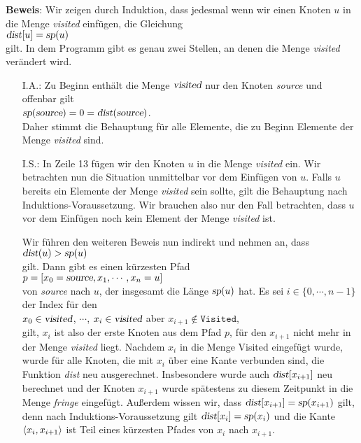 \noindent
\textbf{Beweis}: Wir zeigen durch Induktion, dass jedesmal wenn wir einen Knoten $u$ in die Menge
\textsl{visited} einf\"ugen, die Gleichung
\\[0.2cm]
\hspace*{1.3cm}
$\textsl{dist}[u] = \textsl{sp}(u)$ 
\\[0.2cm]
gilt.
In dem Programm gibt es genau zwei Stellen, an denen die Menge \textsl{visited} ver\"andert wird.
\begin{enumerate}
\item[I.A.:]  
      Zu Beginn enth\"alt die Menge $\textsl{visited}$ nur den Knoten \textsl{source} und offenbar gilt
      \\[0.2cm]
      \hspace*{1.3cm}
      $\textsl{sp}(\textsl{source}) = 0 = \textsl{dist}(\textsl{source})$.
      \\[0.2cm]
      Daher stimmt die Behauptung f\"ur alle Elemente, die zu Beginn Elemente der Menge \textsl{visited} sind.
\item[I.S.:]
      In Zeile 13 f\"ugen wir den Knoten $u$ in die Menge \textsl{visited} ein.
      Wir betrachten nun die Situation unmittelbar vor dem Einf\"ugen von $u$.
      Falls  $u$ bereits ein Elemente der Menge \textsl{visited} sein sollte, gilt die Behauptung
      nach Induktions-Voraussetzung.  
      Wir brauchen also nur den Fall betrachten, dass  $u$ vor dem Einf\"ugen noch kein Element der 
      Menge \textsl{visited} ist.

      Wir f\"uhren den weiteren Beweis nun indirekt und nehmen an, dass 
      \\[0.2cm]
      \hspace*{1.3cm} $\textsl{dist}(u) > \textsl{sp}(u)$
      \\[0.2cm]
      gilt.  Dann gibt es einen k\"urzesten Pfad 
      \\[0.2cm]
      \hspace*{1.3cm} $p = [ x_0 = \textsl{source}, x_1, \cdots, x_n = u ]$
      \\[0.2cm]
      von \textsl{source} nach $u$, der insgesamt die L\"ange $\textsl{sp}(u)$ hat.
      Es sei  $i\in\{0,\cdots,n-1\}$ der Index f\"ur den 
      \\[0.2cm]
      \hspace*{1.3cm}
      $x_0\in \textsl{visited}$, $\cdots$, $x_i\in \textsl{visited}$ \quad aber \quad $x_{i+1} \not\in \mathtt{Visited}$,
      \\[0.2cm]
      gilt, $x_i$ ist also der erste Knoten aus dem Pfad $p$, f\"ur den $x_{i+1}$ nicht mehr
      in der Menge
      \textsl{visited} liegt.  Nachdem $x_i$ in die Menge Visited eingef\"ugt wurde,
      wurde f\"ur alle Knoten, die mit $x_i$ \"uber eine Kante verbunden sind,
      die Funktion \textsl{dist} neu ausgerechnet.  Insbesondere
      wurde auch $\textsl{dist}[x_{i+1}]$ neu berechnet und der Knoten $x_{i+1}$ wurde 
      sp\"atestens zu diesem Zeitpunkt in die Menge \textsl{fringe} eingef\"ugt.
      Au{\ss}erdem wissen wir, dass $\textsl{dist}[x_{i+1}] = \textsl{sp}(x_{i+1})$ gilt,
      denn nach Induktions-Voraussetzung gilt $\textsl{dist}[x_i] = \textsl{sp}(x_i)$
      und die Kante $\pair(x_i,x_{i+1})$ ist Teil eines k\"urzesten Pfades von $x_i$ nach $x_{i+1}$.
      

\end{enumerate}
